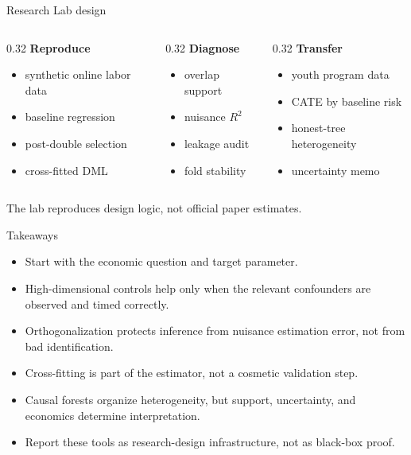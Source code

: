 \documentclass[aspectratio=169,11pt]{beamer}
\newcommand{\1}{\mathbf{1}}
\begin{document}
\begin{frame}{Research Lab design}
\begin{columns}[T,onlytextwidth]
\begin{column}{0.32\linewidth}
\textbf{Reproduce}
\begin{itemize}
    \item synthetic online labor data
    \item baseline regression
    \item post-double selection
    \item cross-fitted DML
\end{itemize}
\end{column}
\begin{column}{0.32\linewidth}
\textbf{Diagnose}
\begin{itemize}
    \item overlap support
    \item nuisance \(R^2\)
    \item leakage audit
    \item fold stability
\end{itemize}
\end{column}
\begin{column}{0.32\linewidth}
\textbf{Transfer}
\begin{itemize}
    \item youth program data
    \item CATE by baseline risk
    \item honest-tree heterogeneity
    \item uncertainty memo
\end{itemize}
\end{column}
\end{columns}

\medskip
The lab reproduces design logic, not official paper estimates.
\end{frame}

\begin{frame}{Takeaways}
\begin{itemize}
    \item Start with the economic question and target parameter.
    \item High-dimensional controls help only when the relevant confounders are observed and timed correctly.
    \item Orthogonalization protects inference from nuisance estimation error, not from bad identification.
    \item Cross-fitting is part of the estimator, not a cosmetic validation step.
    \item Causal forests organize heterogeneity, but support, uncertainty, and economics determine interpretation.
    \item Report these tools as research-design infrastructure, not as black-box proof.
\end{itemize}
\end{frame}
\end{document}
